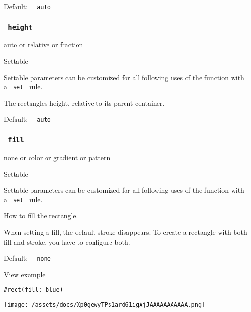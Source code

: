 Default: \texttt{\ }{\texttt{\ auto\ }}\texttt{\ }

\subsubsection{\texorpdfstring{\texttt{\ height\ }}{ height }}\label{parameters-height}

\href{/docs/reference/foundations/auto/}{auto} {or}
\href{/docs/reference/layout/relative/}{relative} {or}
\href{/docs/reference/layout/fraction/}{fraction}

{{ Settable }}

\label{parameters-height-settable-tooltip}
Settable parameters can be customized for all following uses of the
function with a \texttt{\ set\ } rule.

The rectangle\textquotesingle s height, relative to its parent
container.

Default: \texttt{\ }{\texttt{\ auto\ }}\texttt{\ }

\subsubsection{\texorpdfstring{\texttt{\ fill\ }}{ fill }}\label{parameters-fill}

\href{/docs/reference/foundations/none/}{none} {or}
\href{/docs/reference/visualize/color/}{color} {or}
\href{/docs/reference/visualize/gradient/}{gradient} {or}
\href{/docs/reference/visualize/pattern/}{pattern}

{{ Settable }}

\label{parameters-fill-settable-tooltip}
Settable parameters can be customized for all following uses of the
function with a \texttt{\ set\ } rule.

How to fill the rectangle.

When setting a fill, the default stroke disappears. To create a
rectangle with both fill and stroke, you have to configure both.

Default: \texttt{\ }{\texttt{\ none\ }}\texttt{\ }


View example

\begin{verbatim}
#rect(fill: blue)
\end{verbatim}

\texttt{[image: /assets/docs/Xp0gewyTPs1ard61igAjJAAAAAAAAAAA.png]}

